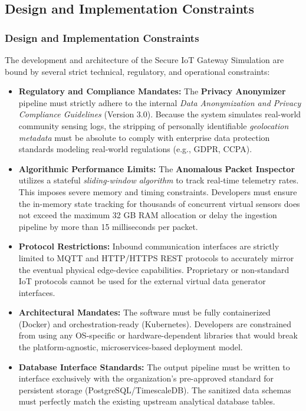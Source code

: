 \documentclass[12pt,letterpaper]{article}
\begin{document}
\subsection{Design and Implementation Constraints}
\subsubsection{Design and Implementation Constraints}
The development and architecture of the Secure IoT Gateway Simulation are bound by several strict technical, regulatory, and operational constraints:\par
\begin{itemize}
\item \textbf{Regulatory and Compliance Mandates:} The \textbf{Privacy Anonymizer} pipeline must strictly adhere to the internal \emph{Data Anonymization and Privacy Compliance Guidelines} (Version 3.0). Because the system simulates real-world community sensing logs, the stripping of personally identifiable \emph{geolocation metadata} must be absolute to comply with enterprise data protection standards modeling real-world regulations (e.g., GDPR, CCPA).
\item \textbf{Algorithmic Performance Limits:} The \textbf{Anomalous Packet Inspector} utilizes a stateful \emph{sliding-window algorithm} to track real-time telemetry rates. This imposes severe memory and timing constraints. Developers must ensure the in-memory state tracking for thousands of concurrent virtual sensors does not exceed the maximum 32 GB RAM allocation or delay the ingestion pipeline by more than 15 milliseconds per packet.
\item \textbf{Protocol Restrictions:} Inbound communication interfaces are strictly limited to MQTT and HTTP/HTTPS REST protocols to accurately mirror the eventual physical edge-device capabilities. Proprietary or non-standard IoT protocols cannot be used for the external virtual data generator interfaces.
\item \textbf{Architectural Mandates:} The software must be fully containerized (Docker) and orchestration-ready (Kubernetes). Developers are constrained from using any OS-specific or hardware-dependent libraries that would break the platform-agnostic, microservices-based deployment model.
\item \textbf{Database Interface Standards:} The output pipeline must be written to interface exclusively with the organization's pre-approved standard for persistent storage (PostgreSQL/TimescaleDB). The sanitized data schemas must perfectly match the existing upstream analytical database tables.
\end{itemize}
\vspace{0.08in}
\end{document}
